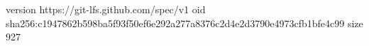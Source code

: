 version https://git-lfs.github.com/spec/v1
oid sha256:c1947862b598ba5f93f50ef6e292a277a8376c2d4e2d3790e4973cfb1bfe4c99
size 927
